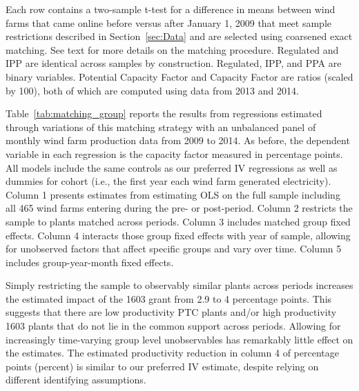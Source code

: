 \documentclass[12pt]{article}
\begin{document}
\begin{table}[h]
\caption{Matching Balance \label{tab:matching_balance}}

\footnotesize
Each row contains a two-sample t-test for a difference in means between wind farms that came online before versus after January 1, 2009 that meet sample restrictions described in Section~\ref{sec:Data} and are selected using coarsened exact matching. See text for more details on the matching procedure. Regulated and IPP are identical across samples by construction. Regulated, IPP, and PPA are binary variables. Potential Capacity Factor and Capacity Factor are ratios (scaled by 100), both of which are computed using data from 2013 and 2014.
\end{table}

Table~\ref{tab:matching_group} reports the results from regressions estimated through variations of this matching strategy with an unbalanced panel of monthly wind farm production data from 2009 to 2014. As before, the dependent variable in each regression is the capacity factor measured in percentage points. All models include the same controls as our preferred IV regressions as well as dummies for cohort (i.e., the first year each wind farm generated electricity). Column 1 presents estimates from estimating OLS on the full sample including all 465 wind farms entering during the pre- or post-period. Column 2 restricts the sample to plants matched across periods. Column 3 includes matched group fixed effects. Column 4 interacts those group fixed effects with year of sample, allowing for unobserved factors that affect specific groups and vary over time. Column 5 includes group-year-month fixed effects. 

Simply restricting the sample to observably similar plants across periods increases the estimated impact of the 1603 grant from 2.9 to 4 percentage points. This suggests that there are low productivity PTC plants and/or high productivity 1603 plants that do not lie in the common support across periods. Allowing for increasingly time-varying group level unobservables has remarkably little effect on the estimates. The estimated productivity reduction in column 4 of percentage points (percent) is similar to our preferred IV estimate, despite relying on different identifying assumptions.
\end{document}
